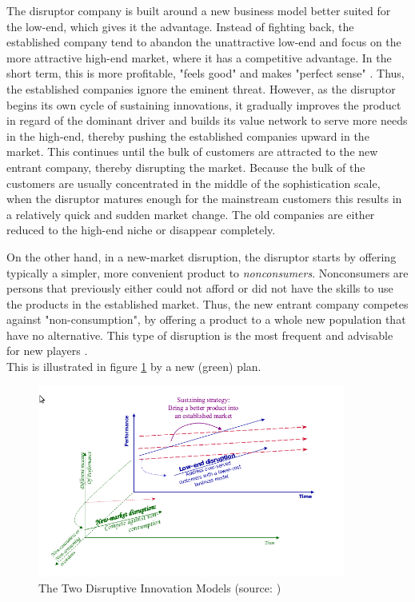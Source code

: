\documentclass[a4paper,10pt]{book}
\begin{document}
The disruptor company is built around a new business model better suited for the low-end, which gives it the advantage.  
Instead of fighting back, the established company tend to abandon the unattractive low-end and focus on the more attractive high-end market, where it has
a competitive advantage. In the short term, this is more profitable, "feels good" and makes "perfect sense" \cite{innovatorsSolution}. 
Thus, the established companies ignore the eminent threat. 
However, as the disruptor begins its own cycle of sustaining innovations, it gradually improves the product in regard of the dominant driver 
and builds its value network to serve more needs in the high-end, 
thereby pushing the established companies upward in the market. 
This continues until the bulk of customers are 
attracted to the new entrant company, thereby disrupting the market. Because the bulk of the customers are usually concentrated in the 
middle of the sophistication scale, when the disruptor matures enough for the mainstream customers this results in a relatively 
quick and sudden market change. The old companies are either reduced to the high-end niche or disappear completely.


On the other hand, in a new-market disruption, the disruptor starts by offering 
typically a simpler, more convenient product to \emph{nonconsumers}.
Nonconsumers are persons that previously either could not afford or did not have the skills to use the products in the established 
market.
Thus, the new entrant company competes against "non-consumption", by offering a product to a whole new population that have no alternative. 
This type of disruption is the most frequent \cite{disruptionInEducation} and advisable for new players \cite{DisruptingClassExpandedEdition}. \\
This is illustrated in figure \ref{fig:twoDisruptiveInnovationModels} by a new (green) plan.

\begin{figure}[here]
\includegraphics[width=0.9\textwidth]{images/twoDiruptiveInnovationModels.png}
 \caption{The Two Disruptive Innovation Models (source: \cite{innovatorsSolution})}
\label{fig:twoDisruptiveInnovationModels}
\end{figure}
\end{document}
